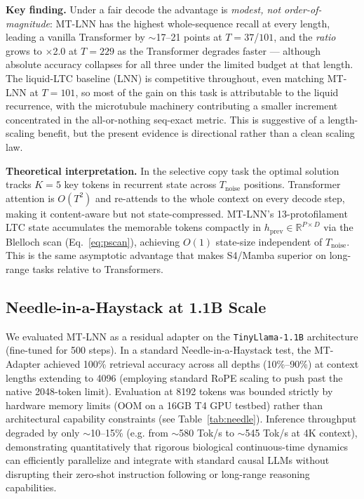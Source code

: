 \documentclass[11pt]{article}
\theoremstyle{definition}
\newcommand{\RR}{\mathbb{R}}
\begin{document}
\textbf{Key finding.} Under a fair decode the advantage is \emph{modest, not order-of-magnitude}: MT-LNN has the highest whole-sequence recall at every length, leading a vanilla Transformer by $\sim$17--21 points at $T=37$/$101$, and the \emph{ratio} grows to $\times$2.0 at $T=229$ as the Transformer degrades faster — although absolute accuracy collapses for all three under the limited budget at that length. The liquid-LTC baseline (LNN) is competitive throughout, even matching MT-LNN at $T=101$, so most of the gain on this task is attributable to the liquid recurrence, with the microtubule machinery contributing a smaller increment concentrated in the all-or-nothing seq-exact metric. This is suggestive of a length-scaling benefit, but the present evidence is directional rather than a clean scaling law.

\textbf{Theoretical interpretation.} In the selective copy task the optimal solution tracks $K=5$ key tokens in recurrent state across $T_\text{noise}$ positions. Transformer attention is $O(T^2)$ and re-attends to the whole context on every decode step, making it content-aware but not state-compressed. MT-LNN's 13-protofilament LTC state accumulates the memorable tokens compactly in $h_\text{prev}\in\RR^{P\times D}$ via the Blelloch scan (Eq.\ \ref{eq:pscan}), achieving $O(1)$ state-size independent of $T_\text{noise}$. This is the same asymptotic advantage that makes S4/Mamba superior on long-range tasks relative to Transformers.

\subsection{Needle-in-a-Haystack at 1.1B Scale}
We evaluated MT-LNN as a residual adapter on the \texttt{TinyLlama-1.1B} architecture (fine-tuned for 500 steps). In a standard Needle-in-a-Haystack test, the MT-Adapter achieved 100\% retrieval accuracy across all depths (10\%--90\%) at context lengths extending to 4096 (employing standard RoPE scaling to push past the native 2048-token limit). Evaluation at 8192 tokens was bounded strictly by hardware memory limits (OOM on a 16GB T4 GPU testbed) rather than architectural capability constraints (see Table~\ref{tab:needle}). Inference throughput degraded by only $\sim$10--15\% (e.g. from $\sim$580 Tok/s to $\sim$545 Tok/s at 4K context), demonstrating quantitatively that rigorous biological continuous-time dynamics can efficiently parallelize and integrate with standard causal LLMs without disrupting their zero-shot instruction following or long-range reasoning capabilities.
\end{document}
